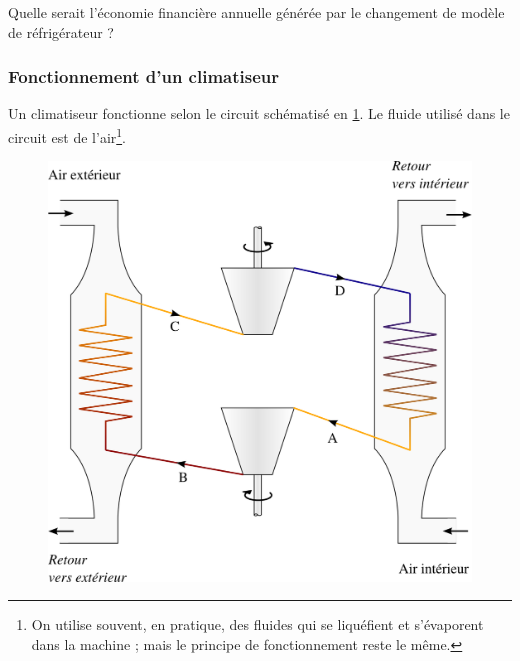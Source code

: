	Quelle serait l’économie financière annuelle générée par le changement de modèle de réfrigérateur ?


\subsubsection{Fonctionnement d’un climatiseur}
\label{exo_fonctionnement_climatiseur}

	Un climatiseur fonctionne selon le circuit schématisé en \cref{fig_exo_climatiseur}. Le fluide utilisé dans le circuit est de l’air\footnote{On utilise souvent, en pratique, des fluides qui se liquéfient et s’évaporent dans la machine ; mais le principe de fonctionnement reste le même.}\nolinebreak.
	
	\begin{figure}
		\begin{center}
		\includegraphics[width=\textwidth]{images/circuit_conditionnement_air.png}
		\end{center}
		\label{fig_exo_climatiseur}
	\end{figure}
	
